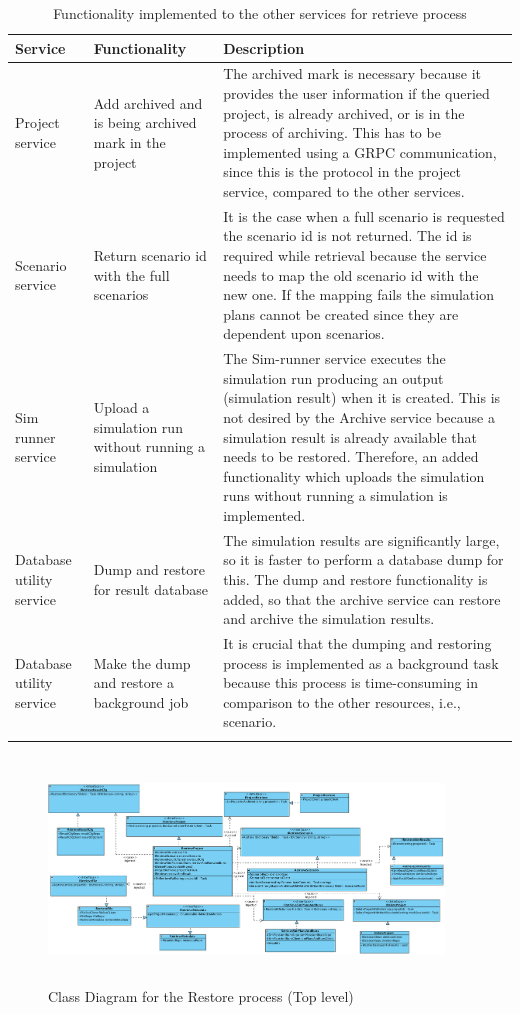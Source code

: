     \begin{longtable}{|p{2cm}|p{6cm}|p{6cm}|}
        \hline
            \textbf{Service}  & \textbf{Functionality} & \textbf{Description}\\
        \hline
            Project service & Add archived and is being archived mark in the project &  The archived mark is necessary because
            it provides the user information if the queried project, is already archived, or is in the process of archiving. This has to be
            implemented using a GRPC communication, since this is the protocol in the project service, compared to the other services.  \\
        \hline
            Scenario service & Return scenario id with the full scenarios & It is the case when a full scenario is requested the scenario id is
            not returned. The id is required while retrieval because the service needs to map the old scenario id with the new one. If the mapping
            fails the simulation plans cannot be created since they are dependent upon scenarios.\\
        \hline
            Sim runner service & Upload a simulation run without running a simulation & The Sim-runner service executes the simulation run producing an
            output (simulation result) when it is created. This is not desired by the Archive service because a simulation result is already available that needs to be restored.
            Therefore, an added 
            functionality which uploads the simulation runs without running a simulation is implemented.\\
        \hline
            Database utility service & Dump and restore for result database & The simulation results are significantly large, so it is faster to
            perform a database dump for this. The dump and restore functionality is added, so that the archive service can restore and archive the simulation results.\\
        \hline
            Database utility service & Make the dump and restore a background job & It is crucial that the dumping and restoring process is implemented as a background task
            because this process is time-consuming in comparison to the other resources, i.e., scenario.\\

        \hline
        \caption{Functionality implemented to the other services for retrieve process}
        \label{table:funcRestore} 
    \end{longtable}

\begin{figure}[H]
    \centering \includegraphics[height=6cm, angle=90, origin=c, width=10.5cm]{grafiken/restoreClass.png}
    \caption{Class Diagram for the Restore process (Top level)}
    \label{fig:restoreClass}
\end{figure}

